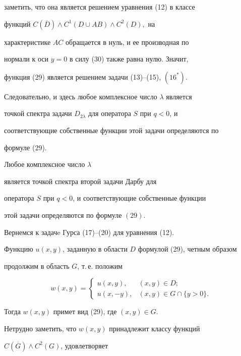 заметить, что она является решением уравнения (12) в классе


функций $C(\overline D)\land C^1(D\cup AB)\land C^2(D),$ на


характеристике $AC$ обращается в нуль, и ее производная по


нормали к оси $y=0$ в силу (30) также равна нулю. Значит,


функция (29) является решением задачи (13)--(15), $(16^*)$.


Следовательно, и здесь любое комплексное число $\lambda $ является


точкой спектра задачи $D_{2\lambda}$ для оператора $S$ при $q<0$, и


соответствующие собственные функции этой задачи определяются по


формуле (29).





\begin{thm}


Любое комплексное число $\lambda$


является точкой спектра второй задачи Дарбу для


оператора $S$ при $q<0$, и соответствующие собственные функции


этой задачи определяются по формуле $(29)$.


\end{thm}





Вернемся к задачe Гурса (17)--(20) для уравнения (12).


Функцию $u(x,y)$, заданную в области $D$ формулой (29), четным образом


продолжим в область $G$, т.\,е. положим


$$


w(x,y)=


\begin{cases}


u(x,y), & (x,y) \in D;\\


u(x,-y), & (x,y) \in G\cap\{ y>0\}.


\end{cases}


$$


Тогда $w(x,y)$ примет вид (29), где $(x,y) \in G$.


Нетрудно заметить, что $w(x,y)$ принадлежит классу функций


$C(\overline G)\land C^2(G)$, удовлетворяет


